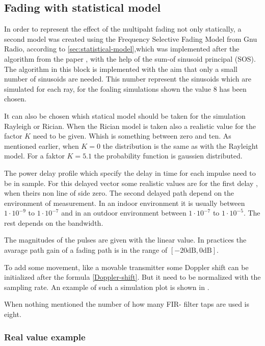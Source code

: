 \subsection{Fading with statistical model}

In order to represent the effect of the multipaht fading not only statically, a second model was created using the Frequency Selective Fading Model from Gnu Radio, according to \ref{sec:statistical-model},which was implemented after the algorithm from the paper \cite{Alimohammad2009}, with the help of the sum-of sinusoid principal (SOS). The algorithm in this block is implemented with the aim that only a small number of sinusoids are needed. 
This number represent the sinusoids which are simulated for each ray, for the foaling simulations shown the value 8 has been chosen.

It can also be chosen whish statical model should be taken for the simulation Rayleigh or Rician. When the Rician model is taken also a realistic value for the factor \(K\) need to be given. Whish is something between zero and ten. As mentioned earlier, when  \(K=0\) the distribution is the same as with the Rayleight model. For a faktor \(K = 5.1\) the probability function is gaussien distributed.

The power delay profile which specify the delay in time for each impulse need to be in sample. For this delayed vector some realistic values are for the first delay \cite{Matlab}, when theirs non line of side zero. The second delayed path depend on the environment of measurement. In an indoor environment it is usually between \(1\cdot10^{-9}\) to \(1\cdot10^{-7}\) and in an outdoor environment between \(1\cdot10^{-7}\) to \(1\cdot10^{-5}\). The rest depends on  the bandwidth. 

The magnitudes of the pulses are given with the linear value. In practices the avarage path gain of a fading path is in the range of \([ -20 \text{dB} , 0\text{dB}]\).

To add some movement, like a movable transmitter some Doppler shift can be initialized after the formula \eqref{Doppler-shift}. But it need to be normalized with the sampling rate. 
An example of such a simulation plot is shown in .

When nothing mentioned the number of how many FIR- filter taps are used is eight.

\subsubsection{Real value example}

